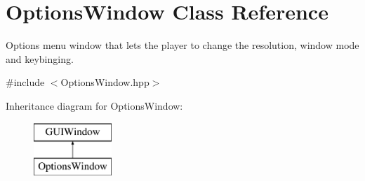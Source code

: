 \hypertarget{class_options_window}{}\section{Options\+Window Class Reference}
\label{class_options_window}


Options menu window that lets the player to change the resolution, window mode and keybinging.  




{\ttfamily \#include $<$Options\+Window.\+hpp$>$}

Inheritance diagram for Options\+Window\+:\begin{figure}[H]
\begin{center}
\leavevmode
\includegraphics[height=2.000000cm]{class_options_window}
\end{center}
\end{figure}
